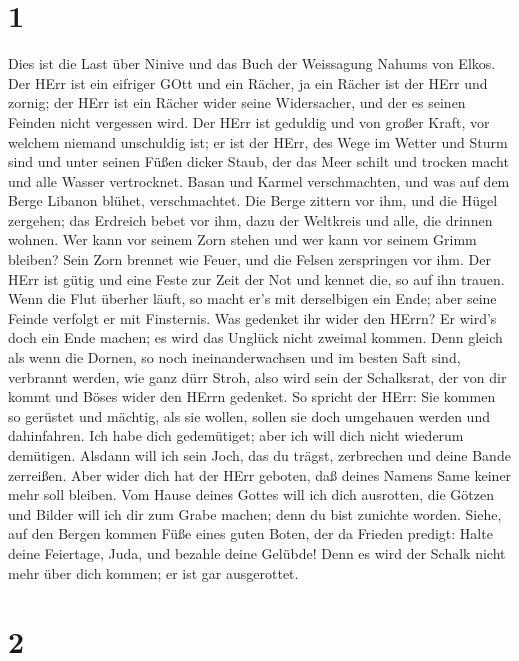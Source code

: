 \hypertarget{section}{%
\section{1}\label{section}}

 Dies ist die Last über Ninive und das Buch der Weissagung
Nahums von Elkos.  Der HErr ist ein eifriger GOtt und ein
Rächer, ja ein Rächer ist der HErr und zornig; der HErr ist ein Rächer
wider seine Widersacher, und der es seinen Feinden nicht vergessen wird.
 Der HErr ist geduldig und von großer Kraft, vor welchem
niemand unschuldig ist; er ist der HErr, des Wege im Wetter und Sturm
sind und unter seinen Füßen dicker Staub,  der das Meer
schilt und trocken macht und alle Wasser vertrocknet. Basan und Karmel
verschmachten, und was auf dem Berge Libanon blühet, verschmachtet.
 Die Berge zittern vor ihm, und die Hügel zergehen; das
Erdreich bebet vor ihm, dazu der Weltkreis und alle, die drinnen wohnen.
 Wer kann vor seinem Zorn stehen und wer kann vor seinem
Grimm bleiben? Sein Zorn brennet wie Feuer, und die Felsen zerspringen
vor ihm.  Der HErr ist gütig und eine Feste zur Zeit der Not
und kennet die, so auf ihn trauen.  Wenn die Flut überher
läuft, so macht er's mit derselbigen ein Ende; aber seine Feinde
verfolgt er mit Finsternis.  Was gedenket ihr wider den
HErrn? Er wird's doch ein Ende machen; es wird das Unglück nicht zweimal
kommen.  Denn gleich als wenn die Dornen, so noch
ineinanderwachsen und im besten Saft sind, verbrannt werden, wie ganz
dürr Stroh,  also wird sein der Schalksrat, der von dir
kommt und Böses wider den HErrn gedenket.  So spricht der
HErr: Sie kommen so gerüstet und mächtig, als sie wollen, sollen sie
doch umgehauen werden und dahinfahren. Ich habe dich gedemütiget; aber
ich will dich nicht wiederum demütigen.  Alsdann will ich
sein Joch, das du trägst, zerbrechen und deine Bande zerreißen.
 Aber wider dich hat der HErr geboten, daß deines Namens
Same keiner mehr soll bleiben. Vom Hause deines Gottes will ich dich
ausrotten, die Götzen und Bilder will ich dir zum Grabe machen; denn du
bist zunichte worden.  Siehe, auf den Bergen kommen Füße
eines guten Boten, der da Frieden predigt: Halte deine Feiertage, Juda,
und bezahle deine Gelübde! Denn es wird der Schalk nicht mehr über dich
kommen; er ist gar ausgerottet.

\hypertarget{section-1}{%
\section{2}\label{section-1}}

